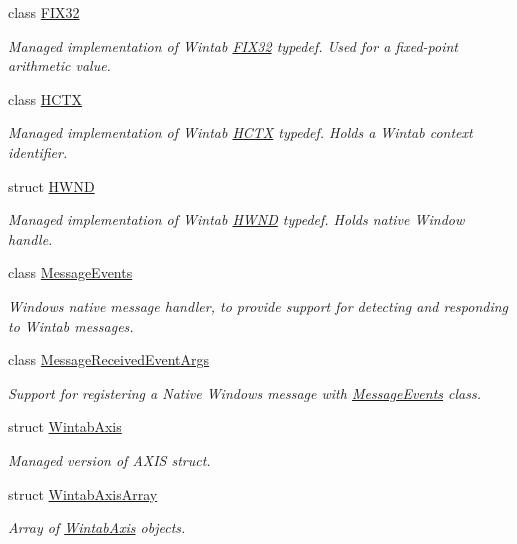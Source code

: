 \begin{DoxyCompactItemize}
class \mbox{\hyperlink{class_wintab_d_n_1_1_f_i_x32}{F\+I\+X32}}
\begin{DoxyCompactList}\small\item\em Managed implementation of Wintab \mbox{\hyperlink{class_wintab_d_n_1_1_f_i_x32}{F\+I\+X32}} typedef. Used for a fixed-\/point arithmetic value. \end{DoxyCompactList}\item 
class \mbox{\hyperlink{class_wintab_d_n_1_1_h_c_t_x}{H\+C\+TX}}
\begin{DoxyCompactList}\small\item\em Managed implementation of Wintab \mbox{\hyperlink{class_wintab_d_n_1_1_h_c_t_x}{H\+C\+TX}} typedef. Holds a Wintab context identifier. \end{DoxyCompactList}\item 
struct \mbox{\hyperlink{struct_wintab_d_n_1_1_h_w_n_d}{H\+W\+ND}}
\begin{DoxyCompactList}\small\item\em Managed implementation of Wintab \mbox{\hyperlink{struct_wintab_d_n_1_1_h_w_n_d}{H\+W\+ND}} typedef. Holds native Window handle. \end{DoxyCompactList}\item 
class \mbox{\hyperlink{class_wintab_d_n_1_1_message_events}{Message\+Events}}
\begin{DoxyCompactList}\small\item\em Windows native message handler, to provide support for detecting and responding to Wintab messages. \end{DoxyCompactList}\item 
class \mbox{\hyperlink{class_wintab_d_n_1_1_message_received_event_args}{Message\+Received\+Event\+Args}}
\begin{DoxyCompactList}\small\item\em Support for registering a Native Windows message with \mbox{\hyperlink{class_wintab_d_n_1_1_message_events}{Message\+Events}} class. \end{DoxyCompactList}\item 
struct \mbox{\hyperlink{struct_wintab_d_n_1_1_wintab_axis}{Wintab\+Axis}}
\begin{DoxyCompactList}\small\item\em Managed version of A\+X\+IS struct. \end{DoxyCompactList}\item 
struct \mbox{\hyperlink{struct_wintab_d_n_1_1_wintab_axis_array}{Wintab\+Axis\+Array}}
\begin{DoxyCompactList}\small\item\em Array of \mbox{\hyperlink{struct_wintab_d_n_1_1_wintab_axis}{Wintab\+Axis}} objects. \end{DoxyCompactList}\item 

\end{DoxyCompactItemize}
